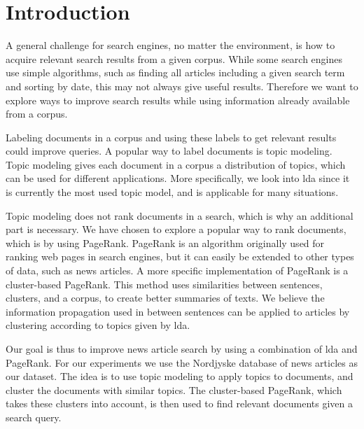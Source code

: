 \section{Introduction}
A general challenge for search engines, no matter the environment, is how to acquire relevant search results from a given corpus.
While some search engines use simple algorithms, such as finding all articles including a given search term and sorting by date, this may not always give useful results.
Therefore we want to explore ways to improve search results while using information already available from a corpus.

Labeling documents in a corpus and using these labels to get relevant results could improve queries.
A popular way to label documents is topic modeling.
Topic modeling gives each document in a corpus a distribution of topics, which can be used for different applications.
More specifically, we look into \gls{lda} since it is currently the most used topic model, and is applicable for many situations\cite{lda}.

Topic modeling does not rank documents in a search, which is why an additional part is necessary.
We have chosen to explore a popular way to rank documents, which is by using PageRank.
PageRank is an algorithm originally used for ranking web pages in search engines, but it can easily be extended to other types of data, such as news articles.
A more specific implementation of PageRank is a cluster-based PageRank\cite{ClusterPageRank}.
This method uses similarities between sentences, clusters, and a corpus, to create better summaries of texts.
We believe the information propagation used in \cite{ClusterPageRank} between sentences can be applied to articles by clustering according to topics given by \gls{lda}.

Our goal is thus to improve news article search by using a combination of \gls{lda} and PageRank.
For our experiments we use the Nordjyske database of news articles as our dataset.
The idea is to use topic modeling to apply topics to documents, and cluster the documents with similar topics.
The cluster-based PageRank, which takes these clusters into account, is then used to find relevant documents given a search query.




